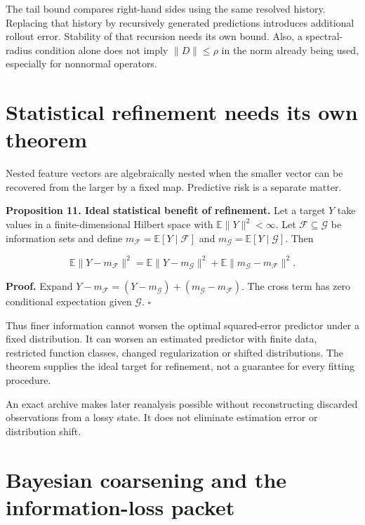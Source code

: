 The tail bound compares right-hand sides using the same resolved
history. Replacing that history by recursively generated predictions
introduces additional rollout error. Stability of that recursion needs
its own bound. Also, a spectral-radius condition alone does not imply
\(\|D\|\leq\rho\) in the norm already being used, especially for
nonnormal operators.

\section{Statistical refinement needs its own theorem}\label{LSM:statistical-refinement-needs-its-own-theorem}

Nested feature vectors are algebraically nested when the smaller vector
can be recovered from the larger by a fixed map. Predictive risk is a
separate matter.

\textbf{Proposition 11. Ideal statistical benefit of refinement.} Let a
target \(Y\) take values in a finite-dimensional Hilbert space with
\(\mathbb E\|Y\|^2<\infty\). Let \(\mathcal F\subseteq\mathcal G\) be
information sets and define
\(m_{\mathcal F}=\mathbb E[Y\mid\mathcal F]\) and
\(m_{\mathcal G}=\mathbb E[Y\mid\mathcal G]\). Then

\[
\mathbb E\|Y-m_{\mathcal F}\|^2
=
\mathbb E\|Y-m_{\mathcal G}\|^2
+\mathbb E\|m_{\mathcal G}-m_{\mathcal F}\|^2.
\]

\textbf{Proof.} Expand
\(Y-m_{\mathcal F}=(Y-m_{\mathcal G})+(m_{\mathcal G}-m_{\mathcal F})\).
The cross term has zero conditional expectation given \(\mathcal G\).
\(\square\)

Thus finer information cannot worsen the optimal squared-error predictor
under a fixed distribution. It can worsen an estimated predictor with
finite data, restricted function classes, changed regularization or
shifted distributions. The theorem supplies the ideal target for
refinement, not a guarantee for every fitting procedure.

An exact archive makes later reanalysis possible without reconstructing
discarded observations from a lossy state. It does not eliminate
estimation error or distribution shift.

\section{Bayesian coarsening and the information-loss packet}\label{LSM:bayesian-coarsening-and-the-information-loss-packet}

